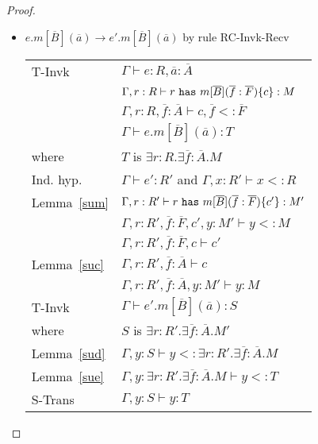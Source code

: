 \documentclass[preprint,nocopyrightspace,9pt]{sigplanconf}
\begin{document}
\begin{proof}
\begin{itemize}
\item $e.m[\overline{B}](\overline{a}) \rightarrow e'.m[\overline{B}](\overline{a})$ by rule {\sc RC-Invk-Recv}
\\
\begin{tabular}{ll}
{\sc T-Invk} & $\Gamma\vdash e:R,\overline{a}:\overline{A}$
\\
& $\Gamma,r:R\vdash r~{\tt has}~m[\overline{B}](\overline{f}:\overline{F})\{c\}:M$
\\
& $\Gamma,r:R,\overline{f}:\overline{A}\vdash c,\overline{f}<:\overline{F}$
\\
& $\Gamma\vdash e.m[\overline{B}](\overline{a}):T$
\\
where & $T$ is $\exists r:R.\exists \overline{f}:\overline{A}.M$
\\
Ind. hyp. & $\Gamma\vdash e':R'$ and $\Gamma,x:R'\vdash x<:R$
\\
Lemma~\ref{sum} & $\Gamma,r:R'\vdash r~{\tt has}~m[\overline{B}](\overline{f}:\overline{F})\{c'\}:M'$
\\
& $\Gamma,r:R',\overline{f}:\overline{F},c',y:M'\vdash y<:M$
\\
& $\Gamma,r:R',\overline{f}:\overline{F},c\vdash c'$
\\
Lemma~\ref{suc} & $\Gamma,r:R',\overline{f}:\overline{A}\vdash c$
\\
& $\Gamma,r:R',\overline{f}:\overline{A},y:M'\vdash y:M$
\\
{\sc T-Invk} & $\Gamma\vdash e'.m[\overline{B}](\overline{a}):S$
\\
where & $S$ is $\exists r:R'.\exists \overline{f}:\overline{A}.M'$
\\
Lemma~\ref{sud} & $\Gamma,y:S\vdash y<:\exists r:R'.\exists\overline{f}:\overline{A}.M$
\\
Lemma~\ref{sue} & $\Gamma,y:\exists r:R'.\exists\overline{f}:\overline{A}.M\vdash y<:T$
\\
{\sc S-Trans} & $\Gamma, y:S\vdash y:T$
\end{tabular}



\end{itemize}
\end{proof}
\end{document}
